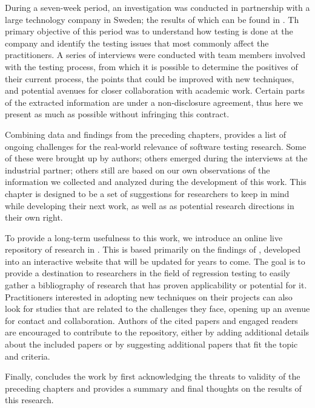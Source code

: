 During a seven-week period, an investigation was conducted in partnership with a large technology company in Sweden; the results of which can be found in .
Th primary objective of this period was to understand how testing is done at the company and identify the testing issues that most commonly affect the practitioners.
A series of interviews were conducted with team members involved with the testing process, from which it is possible to determine the positives of their current process, the points that could be improved with new techniques, and potential avenues for closer collaboration with academic work.
Certain parts of the extracted information are under a non-disclosure agreement, thus here we present as much as possible without infringing this contract.

Combining data and findings from the preceding chapters,  provides a list of ongoing challenges for the real-world relevance of software testing research.
Some of these were brought up by authors; others emerged during the interviews at the industrial partner; others still are based on our own observations of the information we collected and analyzed during the development of this work.
This chapter is designed to be a set of suggestions for researchers to keep in mind while developing their next work, as well as as potential research directions in their own right.

To provide a long-term usefulness to this work, we introduce an online live repository of research in .
This is based primarily on the findings of , developed into an interactive website that will be updated for years to come.
The goal is to provide a destination to researchers in the field of regression testing to easily gather a bibliography of research that has proven applicability or potential for it.
Practitioners interested in adopting new techniques on their projects can also look for studies that are related to the challenges they face, opening up an avenue for contact and collaboration.
Authors of the cited papers and engaged readers are encouraged to contribute to the repository, either by adding additional details about the included papers or by suggesting additional papers that fit the topic and criteria.

Finally,  concludes the work by first acknowledging the threats to validity of the preceding chapters and provides a summary and final thoughts on the results of this research.

